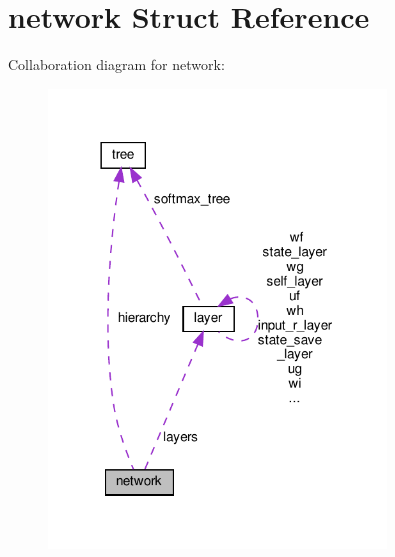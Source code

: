 \hypertarget{structnetwork}{}\section{network Struct Reference}
\label{structnetwork}


Collaboration diagram for network\+:\nopagebreak
\begin{figure}[H]
\begin{center}
\leavevmode
\includegraphics[width=254pt]{structnetwork__coll__graph}
\end{center}
\end{figure}
